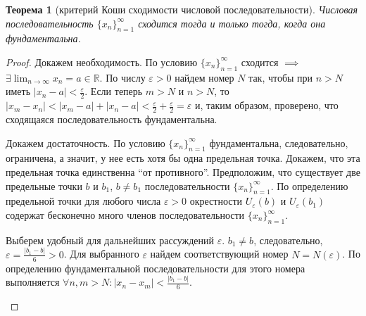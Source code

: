 \documentclass[a4paper,12pt]{article} %
\newtheorem{theorem}{Теорема}[section]
\theoremstyle{remark}
\theoremstyle{definition}
\begin{document}
\begin{theorem}[критерий Коши сходимости числовой последовательности]
	Числовая последовательность $\{x_n\}_{n=1}^{\infty}$ сходится тогда и только тогда, когда она фундаментальна.	
\end{theorem}
\begin{proof}
	Докажем необходимость.
	По условию $\{x_n\}_{n=1}^{\infty}$ сходится $\implies$ $\displaystyle \exists \lim_{n \to \infty} x_n = a \in  \mathbb{R}$. 
    По числу $\varepsilon>0$ найдем номер $N$ так, чтобы при $n > N$ иметь $|x_n-a| < \frac{\varepsilon}{2}$.
    Если теперь $m>N$ и $n>N$, то $|x_{m} - x_{n}| < |x_{m}-a| + |x_{n}-a| < \frac{\varepsilon}{2} 
    + \frac{\varepsilon}{2} = \varepsilon$ и, таким образом, проверено, что сходящаяся последовательность фундаментальна.

	Докажем достаточность.
	По условию $\{x_n\}_{n=1}^{\infty}$ фундаментальна, следовательно, ограничена, а значит, у нее есть хотя бы одна предельная точка. Докажем, что эта предельная точка единственна ``от противного''. Предположим, что существует две предельные точки $b$ и $b_1$, $b\neq b_1$ последовательности $\{x_n\}_{n=1}^{\infty}$. По определению предельной точки для любого числа $\varepsilon>0$ окрестности $U_\varepsilon(b)$ и $U_\varepsilon(b_1)$ содержат бесконечно много членов последовательности $\{x_n\}_{n=1}^{\infty}$.

	Выберем удобный для дальнейших рассуждений $\varepsilon$. $b_1\neq b$, следовательно, 
    $\displaystyle \varepsilon=\frac{|b_1-b|}{6}>0$. Для выбранного $\varepsilon$ найдем соответствующий номер 
    $N=N(\varepsilon)$. По определению фундаментальной последовательности для этого номера выполняется 
    $\displaystyle \forall n, m > N : |x_{n}-x_{m}| < \frac{|b_1-b|}{6}$. 
\begin{center}
\end{center}


\end{proof}
\end{document}

